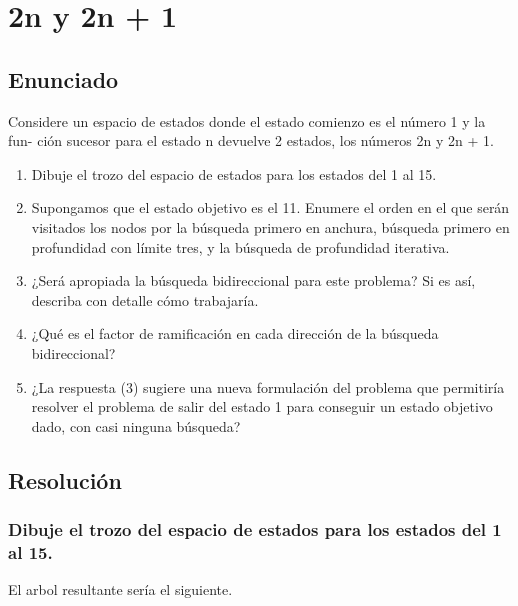 \documentclass[a4paper,10pt]{article}
\begin{document}
\section{2n y 2n + 1}
\subsection{Enunciado}
Considere un espacio de estados donde el estado comienzo es el número 1 y la fun-
ción sucesor para el estado n devuelve 2 estados, los números 2n y 2n + 1.
\begin{enumerate}
	\item Dibuje el trozo del espacio de estados para los estados del 1 al 15.
	\item Supongamos que el estado objetivo es el 11. Enumere el orden en el que serán
	visitados los nodos por la búsqueda primero en anchura, búsqueda primero en
	profundidad con límite tres, y la búsqueda de profundidad iterativa.
	\item ¿Será apropiada la búsqueda bidireccional para este problema? Si es así, describa con detalle cómo trabajaría.
	\item ¿Qué es el factor de ramificación en cada dirección de la búsqueda bidireccional?
	\item ¿La respuesta (3) sugiere una nueva formulación del problema que permitiría
	resolver el problema de salir del estado 1 para conseguir un estado objetivo dado,
	con casi ninguna búsqueda?
\end{enumerate}
\subsection{Resolución}
\subsubsection{Dibuje el trozo del espacio de estados para los estados del 1 al 15.}
El arbol resultante sería el siguiente.\\
\pagebreak
\end{document}
